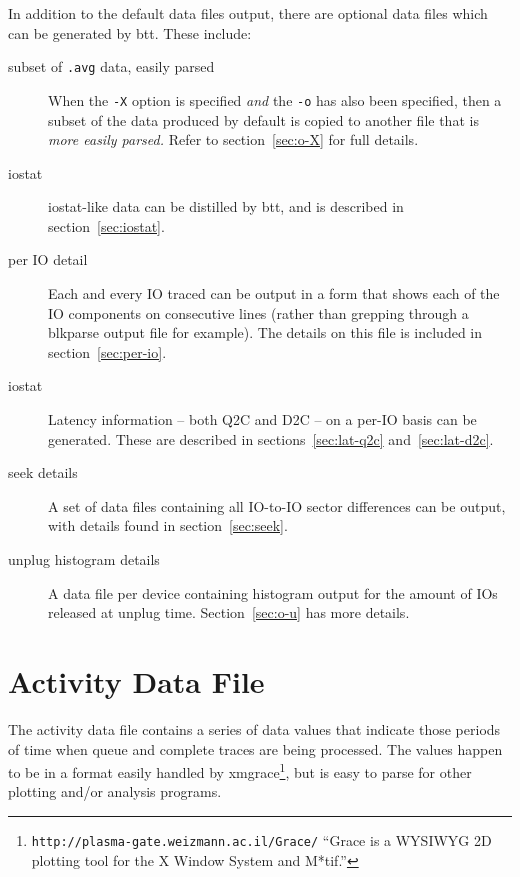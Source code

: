 \documentclass{article}
\begin{document}
  In addition to the default data files output, there are optional data
  files which can be generated by btt. These include:

  \begin{description}
    \item[subset of \texttt{.avg} data, easily parsed ] When the
    \texttt{-X} option is specified \emph{and} the \texttt{-o} has also
    been specified, then a subset of the data produced by default is
    copied to another file that is \emph{more easily parsed.} Refer to
    section~\ref{sec:o-X} for full details.

    \item[iostat] iostat-like data can be distilled by btt, and is
    described in section~\ref{sec:iostat}.

    \item[per IO detail] Each and every IO traced can be output in a form
    that shows each of the IO components on consecutive lines (rather
    than grepping through a blkparse output file for example). The
    details on this file is included in section~\ref{sec:per-io}.

    \item[iostat] Latency information -- both Q2C and D2C --
    on a per-IO basis can be generated. These are described in
    sections~\ref{sec:lat-q2c} and~\ref{sec:lat-d2c}.

    \item[seek details] A set of data files containing all IO-to-IO
    sector differences can be output, with details found in
    section~\ref{sec:seek}.

    \item[unplug histogram details] A data file per device containing
    histogram output for the amount of IOs released at unplug time.
    Section~\ref{sec:o-u} has more details.
  \end{description}

\newpage\section{\label{sec:activity}Activity Data File}

  The activity data file contains a series of data values that indicate
  those periods of time when queue and complete traces are being
  processed.  The values happen to be in a format easily handled by
  xmgrace\footnote{\texttt{http://plasma-gate.weizmann.ac.il/Grace/}
  ``Grace is a WYSIWYG 2D plotting tool for the X Window System and
  M*tif.''}, but is easy to parse for other plotting and/or analysis
  programs.
\end{document}
